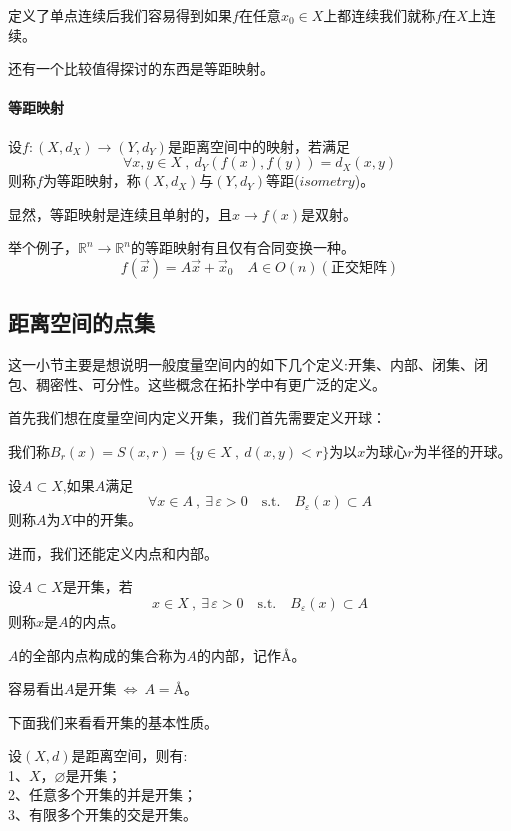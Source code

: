 定义了单点连续后我们容易得到如果$f$在任意$x_0 \in X$上都连续我们就称$f$在$X$上连续。

还有一个比较值得探讨的东西是等距映射。
\paragraph*{等距映射} \quad 设$f:(X,d_X) \rightarrow (Y,d_Y)$是距离空间中的映射，若满足
\[\forall x,y \in X \ , \ d_Y(f(x),f(y))=d_X(x,y)\]
则称$f$为等距映射，称$(X,d_X)$与$(Y,d_Y)$等距($isometry$)。

显然，等距映射是连续且单射的，且$x \rightarrow f(x)$是双射。

举个例子，$\mathbb{R}^n \rightarrow \mathbb{R}^n$的等距映射有且仅有合同变换一种。
\[f(\overrightarrow{x})=A\overrightarrow{x}+\overrightarrow{x}_0 \quad A \in O(n)(\text{正交矩阵})\]

\subsection{距离空间的点集} \label{pointset}
这一小节主要是想说明一般度量空间内的如下几个定义:开集、内部、闭集、闭包、稠密性、可分性。这些概念在拓扑学中有更广泛的定义。

首先我们想在度量空间内定义开集，我们首先需要定义开球：
\begin{definition}[开球]
    我们称$B_r(x)=S(x,r)=\{y \in X \ , \ d(x,y)<r\}$为以$x$为球心$r$为半径的开球。
\end{definition}
\begin{definition}[开集]
    设$A \subset X$,如果$A$满足
    \[\forall x \in A \ , \ \exists \, \varepsilon>0 \quad \text{s.t.} \quad B_{\varepsilon}(x) \subset A\]
    则称$A$为$X$中的开集。
\end{definition}
进而，我们还能定义内点和内部。
\begin{definition}[内点]
    设$A \subset X$是开集，若
    \[x \in X \ , \ \exists \, \varepsilon>0 \quad \text{s.t.} \quad B_{\varepsilon}(x) \subset A\]
    则称$x$是$A$的内点。
\end{definition}
\begin{definition}[内部]
    $A$的全部内点构成的集合称为$A$的内部，记作\AA。
\end{definition}
容易看出$A$是开集$ \ \Leftrightarrow \ A=$\AA。

下面我们来看看开集的基本性质。
\begin{theorem}
    设$(X,d)$是距离空间，则有:\\
    1、$X$，$\varnothing$是开集；\\
    2、任意多个开集的并是开集；\\
    3、有限多个开集的交是开集。
\end{theorem}

